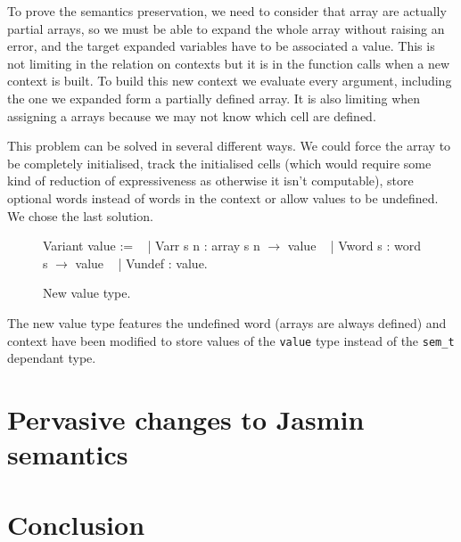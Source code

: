\documentclass{article}
\begin{document}
\medskip

To prove the semantics preservation, we need to consider that array are actually
partial arrays, so we must be able to expand the whole array without raising an
error, and the target expanded variables have to be associated a value. This is
not limiting in the relation on contexts but it is in the function calls when a
new context is built. To build this new context we evaluate every argument,
including the one we expanded form a partially defined array. It is also
limiting when assigning a arrays because we may not know which cell are defined.

This problem can be solved in several different ways. We could force the array
to be completely initialised, track the initialised cells (which would require
some kind of reduction of expressiveness as otherwise it isn't computable),
store optional words instead of words in the context or allow values to be
undefined. We chose the last solution.

\smallskip

\begin{figure}[t]
\obeylines\obeyspaces\ttfamily%
Variant value :=
~ | Varr s n : array s n \(\rightarrow\) value
~ | Vword s  : word  s   \(\rightarrow\) value
~ | Vundef   :              value.
\normalfont%
\caption{New value type.}
\end{figure}

The new value type features the undefined word (arrays are always defined) and
context have been modified to store values of the \texttt{value} type instead of
the \texttt{sem\_t} dependant type.


\section{Pervasive changes to Jasmin semantics}\label{sec:perch}

\section{Conclusion}\label{sec:ccl}
\end{document}
